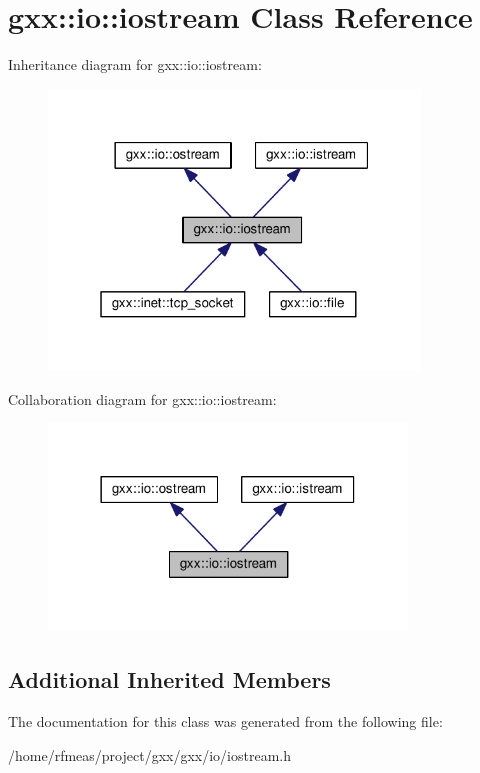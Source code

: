 \hypertarget{classgxx_1_1io_1_1iostream}{}\section{gxx\+:\+:io\+:\+:iostream Class Reference}
\label{classgxx_1_1io_1_1iostream}


Inheritance diagram for gxx\+:\+:io\+:\+:iostream\+:
\nopagebreak
\begin{figure}[H]
\begin{center}
\leavevmode
\includegraphics[width=280pt]{classgxx_1_1io_1_1iostream__inherit__graph}
\end{center}
\end{figure}


Collaboration diagram for gxx\+:\+:io\+:\+:iostream\+:
\nopagebreak
\begin{figure}[H]
\begin{center}
\leavevmode
\includegraphics[width=270pt]{classgxx_1_1io_1_1iostream__coll__graph}
\end{center}
\end{figure}
\subsection*{Additional Inherited Members}


The documentation for this class was generated from the following file\+:\begin{DoxyCompactItemize}
\item 
/home/rfmeas/project/gxx/gxx/io/iostream.\+h\end{DoxyCompactItemize}
